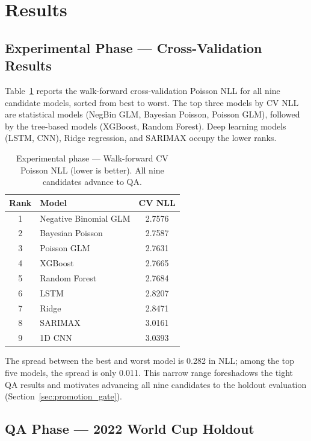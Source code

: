 \documentclass[conference]{IEEEtran}
\begin{document}
\section{Results}
\label{sec:results}

\subsection{Experimental Phase — Cross-Validation Results}

Table~\ref{tab:cv_results} reports the walk-forward cross-validation Poisson NLL
for all nine candidate models, sorted from best to worst.  The top three models
by CV NLL are statistical models (NegBin GLM, Bayesian Poisson, Poisson GLM),
followed by the tree-based models (XGBoost, Random Forest).  Deep learning
models (LSTM, CNN), Ridge regression, and SARIMAX occupy the lower ranks.

\begin{table}[h]
  \centering
  \caption{Experimental phase --- Walk-forward CV Poisson NLL (lower is better).
  All nine candidates advance to QA.}
  \label{tab:cv_results}
  \begin{tabular}{clc}
    \toprule
    Rank & Model & CV NLL \\
    \midrule
    1 & Negative Binomial GLM & 2.7576 \\
    2 & Bayesian Poisson      & 2.7587 \\
    3 & Poisson GLM           & 2.7631 \\
    4 & XGBoost               & 2.7665 \\
    5 & Random Forest         & 2.7684 \\
    6 & LSTM                  & 2.8207 \\
    7 & Ridge                 & 2.8471 \\
    8 & SARIMAX               & 3.0161 \\
    9 & 1D CNN                & 3.0393 \\
    \bottomrule
  \end{tabular}
\end{table}

The spread between the best and worst model is 0.282 in NLL; among the top
five models, the spread is only 0.011.  This narrow range foreshadows the
tight QA results and motivates advancing all nine candidates to the holdout
evaluation (Section~\ref{sec:promotion_gate}).

\subsection{QA Phase — 2022 World Cup Holdout}
\end{document}
